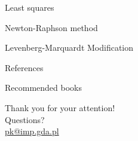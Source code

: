 \documentclass[10pt,aspectratio=169,notes]{beamer} %
\begin{document}
\begin{frame}{Least squares}
	
\end{frame}
\note{}
\begin{frame}{Newton-Raphson method}
	
\end{frame}
\note{}
\begin{frame}{Levenberg-Marquardt Modification}
	
\end{frame}
\note{}

\begin{frame}{References}
	\begin{biblio}{Recommended books}
	\end{biblio}
\end{frame}
{
	\begin{frame}[standout]
		Thank you for your attention!\\ \vspace{12pt}
		Questions?\\ \vspace{12pt}
		\url{pk@imp.gda.pl}
	\end{frame}
}
\end{document}
